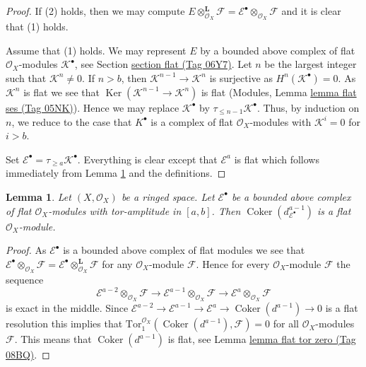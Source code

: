 \documentclass{amsart}
\theoremstyle{plain}
\newtheorem{lemma}[subsection]{Lemma}
\theoremstyle{definition}
\theoremstyle{remark}
\numberwithin{equation}{subsection}
\def\Ker{\mathop{\mathrm{Ker}}}
\def\Coker{\mathop{\mathrm{Coker}}}
\begin{document}
\begin{proof}
If (2) holds, then we may compute
$E \otimes_{\mathcal{O}_X}^\mathbf{L} \mathcal{F} =
\mathcal{E}^\bullet \otimes_{\mathcal{O}_X} \mathcal{F}$
and it is clear that (1) holds.

\medskip\noindent
Assume that (1) holds. We may represent $E$ by a bounded above complex
of flat $\mathcal{O}_X$-modules $\mathcal{K}^\bullet$, see
Section \href{https://stacks.math.columbia.edu/tag/06Y7}{section flat (Tag 06Y7)}.
Let $n$ be the largest integer such that $\mathcal{K}^n \not = 0$.
If $n > b$, then $\mathcal{K}^{n - 1} \to \mathcal{K}^n$ is surjective as
$H^n(\mathcal{K}^\bullet) = 0$. As $\mathcal{K}^n$ is flat we see that
$\Ker(\mathcal{K}^{n - 1} \to \mathcal{K}^n)$ is flat
(Modules, Lemma \href{https://stacks.math.columbia.edu/tag/05NK}{lemma flat ses (Tag 05NK)}).
Hence we may replace $\mathcal{K}^\bullet$ by
$\tau_{\leq n - 1}\mathcal{K}^\bullet$. Thus, by induction on $n$, we
reduce to the case that $K^\bullet$ is a complex of flat
$\mathcal{O}_X$-modules with $\mathcal{K}^i = 0$ for $i > b$.

\medskip\noindent
Set $\mathcal{E}^\bullet = \tau_{\geq a}\mathcal{K}^\bullet$.
Everything is clear except that $\mathcal{E}^a$ is flat
which follows immediately from Lemma \ref{cohomology-lemma-last-one-flat}
and the definitions.
\end{proof}


\begin{lemma}
\label{cohomology-lemma-last-one-flat}
Let $(X, \mathcal{O}_X)$ be a ringed space.
Let $\mathcal{E}^\bullet$ be a bounded above complex of flat
$\mathcal{O}_X$-modules with tor-amplitude in $[a, b]$.
Then $\Coker(d_{\mathcal{E}^\bullet}^{a - 1})$ is a flat
$\mathcal{O}_X$-module.
\end{lemma}

\begin{proof}
As $\mathcal{E}^\bullet$ is a bounded above complex of flat modules we see that
$\mathcal{E}^\bullet \otimes_{\mathcal{O}_X} \mathcal{F} =
\mathcal{E}^\bullet \otimes_{\mathcal{O}_X}^{\mathbf{L}} \mathcal{F}$
for any $\mathcal{O}_X$-module $\mathcal{F}$.
Hence for every $\mathcal{O}_X$-module $\mathcal{F}$ the sequence
$$
\mathcal{E}^{a - 2} \otimes_{\mathcal{O}_X} \mathcal{F} \to
\mathcal{E}^{a - 1} \otimes_{\mathcal{O}_X} \mathcal{F} \to
\mathcal{E}^a \otimes_{\mathcal{O}_X} \mathcal{F}
$$
is exact in the middle. Since
$\mathcal{E}^{a - 2} \to \mathcal{E}^{a - 1} \to \mathcal{E}^a \to
\Coker(d^{a - 1}) \to 0$
is a flat resolution this implies that
$\text{Tor}_1^{\mathcal{O}_X}(\Coker(d^{a - 1}), \mathcal{F}) = 0$
for all $\mathcal{O}_X$-modules $\mathcal{F}$. This means that
$\Coker(d^{a - 1})$ is flat, see Lemma \href{https://stacks.math.columbia.edu/tag/08BQ}{lemma flat tor zero (Tag 08BQ)}.
\end{proof}
\end{document}
